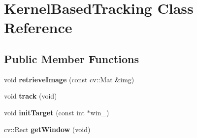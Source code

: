 \hypertarget{classKernelBasedTracking}{\section{\-Kernel\-Based\-Tracking \-Class \-Reference}
\label{classKernelBasedTracking}
}
\subsection*{\-Public \-Member \-Functions}
\begin{DoxyCompactItemize}
\item 
\hypertarget{classKernelBasedTracking_a65e6532da171554cad0fc74c7d4c7ca6}{void {\bfseries retrieve\-Image} (const cv\-::\-Mat \&img)}\label{classKernelBasedTracking_a65e6532da171554cad0fc74c7d4c7ca6}

\item 
\hypertarget{classKernelBasedTracking_ad164231a0ee0c622857c1c7ffaf007cd}{void {\bfseries track} (void)}\label{classKernelBasedTracking_ad164231a0ee0c622857c1c7ffaf007cd}

\item 
\hypertarget{classKernelBasedTracking_a0fb7cd463da00e07d6dca1decc0cf811}{void {\bfseries init\-Target} (const int $\ast$win\-\_\-)}\label{classKernelBasedTracking_a0fb7cd463da00e07d6dca1decc0cf811}

\item 
\hypertarget{classKernelBasedTracking_a9ca944a7e64bf2530d1f4467fc567221}{cv\-::\-Rect {\bfseries get\-Window} (void)}\label{classKernelBasedTracking_a9ca944a7e64bf2530d1f4467fc567221}

\end{DoxyCompactItemize}
